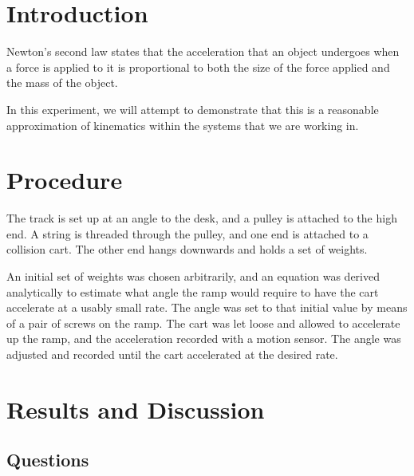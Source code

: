 \section{Introduction}

Newton's second law states that the acceleration that an object undergoes when a force is applied to it is proportional to both the size of the force applied and the mass of the object.

In this experiment, we will attempt to demonstrate that this is a reasonable approximation of kinematics within the systems that we are working in.

\section{Procedure}

The track is set up at an angle to the desk, and a pulley is attached to the high end.
A string is threaded through the pulley, and one end is attached to a collision cart.
The other end hangs downwards and holds a set of weights.

An initial set of weights was chosen arbitrarily, and an equation was derived analytically to estimate what angle the ramp would require to have the cart accelerate at a usably small rate.
The angle was set to that initial value by means of a pair of screws on the ramp.
The cart was let loose and allowed to accelerate up the ramp, and the acceleration recorded with a motion sensor.
The angle was adjusted and recorded until the cart accelerated at the desired rate.

\section{Results and Discussion}

\subsection{Questions}

